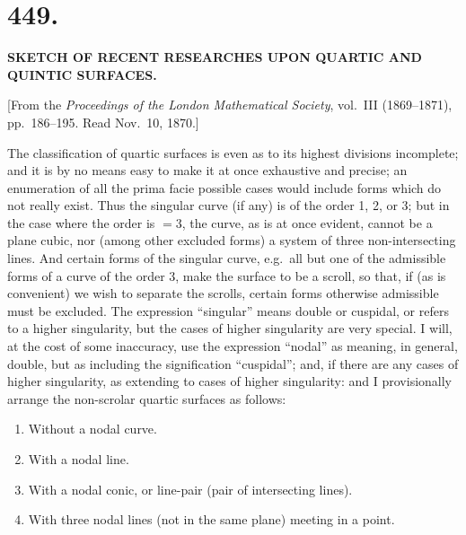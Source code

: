 \documentclass[11pt,a4paper]{article}
\begin{document}
\clearpage

\section*{\textbf{449.}}

\begin{center}
\textbf{SKETCH OF RECENT RESEARCHES UPON QUARTIC AND QUINTIC SURFACES.}
\end{center}

[From the \textit{Proceedings of the London Mathematical Society}, vol.~III (1869--1871), pp.~186--195. Read Nov.~10, 1870.]

The classification of quartic surfaces is even as to its highest divisions incomplete; and it is by no means easy to make it at once exhaustive and precise; an enumeration of all the prima facie possible cases would include forms which do not really exist. Thus the singular curve (if any) is of the order 1, 2, or 3; but in the case where the order is $= 3$, the curve, as is at once evident, cannot be a plane cubic, nor (among other excluded forms) a system of three non-intersecting lines. And certain forms of the singular curve, e.g.\ all but one of the admissible forms of a curve of the order 3, make the surface to be a scroll, so that, if (as is convenient) we wish to separate the scrolls, certain forms otherwise admissible must be excluded. The expression ``singular'' means double or cuspidal, or refers to a higher singularity, but the cases of higher singularity are very special. I will, at the cost of some inaccuracy, use the expression ``nodal'' as meaning, in general, double, but as including the signification ``cuspidal''; and, if there are any cases of higher singularity, as extending to cases of higher singularity: and I provisionally arrange the non-scrolar quartic surfaces as follows:
\begin{enumerate}[label=\arabic*.]
\item Without a nodal curve.
\item With a nodal line.
\item With a nodal conic, or line-pair (pair of intersecting lines).
\item With three nodal lines (not in the same plane) meeting in a point.
\end{enumerate}
\end{document}
